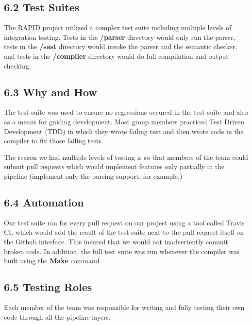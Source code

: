 \subsection*{6.2 Test Suites}

The RAPID project utilized a complex test suite including multiple levels of integration testing. Tests in the \textbf{/parser} directory would only run the parser, tests in the \textbf{/sast} directory would invoke the parser and the semantic checker, and tests in the \textbf{/compiler} directory would do full compilation and output checking.

\subsection*{6.3 Why and How}

The test suite was used to ensure no regressions occured in the test suite and also as a means for guiding development. Most group members practiced Test Driven Development (TDD) in which they wrote failing test and then wrote code in the compiler to fix those failing tests.

The reason we had multiple levels of testing is so that members of the team could submit pull requests which would implement features only partially in the pipeline (implement only the parsing support, for example.)

\subsection*{6.4 Automation}

Our test suite ran for every pull request on our project using a tool called Travis CI, which would add the result of the test suite next to the pull request itself on the Github interface.
This insured that we would not inadvertently commit broken code.
In addition, the full test suite was run whenever the compiler was built using the \textbf{Make} command.

\subsection*{6.5 Testing Roles}
Each member of the team was responsible for writing and fully testing their own code through all the pipeline layers.
